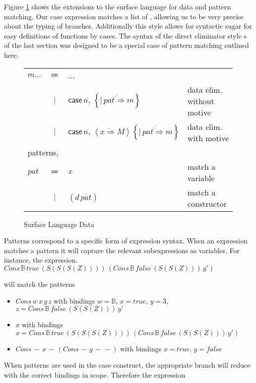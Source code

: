 Figure \ref{fig:surface-data} shows the extensions to the surface language for data and pattern matching.
Our case expression matches a list of \scruts{}, allowing us to be very precise about the typing of branches.
Additionally this style allows for syntactic sugar for easy definitions of functions by cases.
The syntax of the direct eliminator style \case{}s of the last section was designed to be a special case of pattern matching outlined here.

\begin{figure}
\begin{tabular}{lcll}
$m...$ & $\Coloneqq$ & ... & \tabularnewline
 & $|$ & $\mathsf{case}\,\overline{n,}\,\left\{ \overline{|\,\overline{pat\Rightarrow}m}\right\} $ & data elim. without motive\tabularnewline
 & $|$ & $\mathsf{case}\,\overline{n,}\,\left\langle \overline{x\Rightarrow}M\right\rangle \left\{ \overline{|\,\overline{pat\Rightarrow}m}\right\} $ & data elim. with motive\tabularnewline
\multicolumn{4}{l}{patterns,}\tabularnewline
$pat$ & $\Coloneqq$ & $x$ & match a variable\tabularnewline
 & $|$ & $(d\,\overline{pat})$ & match a constructor\tabularnewline
\end{tabular}

\caption{Surface Language Data}
\label{fig:surface-data}
\end{figure}

Patterns correspond to a specific form of expression syntax.
When an expression matches a pattern it will capture the relevant subexpressions as variables.
For instance, the expression. 
$Cons\,\mathbb{B}\,true\,\left(S\left(S\left(S\left(Z\right)\right)\right)\right)\,\left(Cons\,\mathbb{B}\,false\,\left(S\left(S\left(Z\right)\right)\right)\,y'\right)$

will match the patterns
\begin{itemize}
\item $Cons\,w\,x\,y\,z$ with bindings $w=\mathbb{B}$, $x=true$, $y=3$, $z=Cons\,\mathbb{B}\,false\,\left(S\left(S\left(Z\right)\right)\right)\,y'$
\item $x$ with bindings $x=Cons\,\mathbb{B}\,true\,\left(S\left(S\left(S\left(Z\right)\right)\right)\right)\,\left(Cons\,\mathbb{B}\,false\,\left(S\left(S\left(Z\right)\right)\right)\,y'\right)$ 
\item $Cons\,-\,x\,-\,\left(Cons\,-\,y\,-\,-\right)$ with bindings $x=true$, $y=false$
\end{itemize}
When patterns are used in the case construct, the appropriate branch will reduce with the correct bindings in scope.
Therefore the expression 

